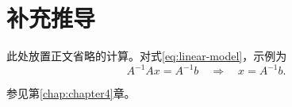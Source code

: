 \chapter{补充推导}
\label{app:derivation}

此处放置正文省略的计算。对式\eqref{eq:linear-model}，示例为
\begin{equation}
  A^{-1}Ax=A^{-1}b
  \quad\Longrightarrow\quad x=A^{-1}b.
  \label{eq:appendix-derivation}
\end{equation}

参见第\ref{chap:chapter4}章。

